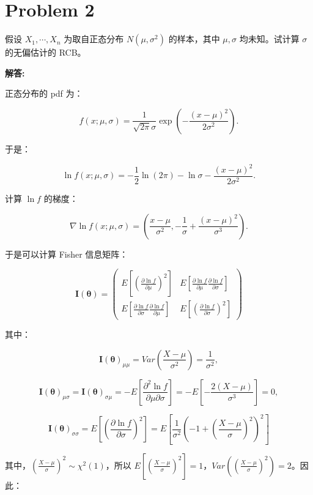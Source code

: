 \documentclass[12pt,a4paper]{article}
\begin{document}
\section{Problem 2}

假设 $X_1,\cdots,X_n$ 为取自正态分布 $N(\mu,\sigma^2)$ 的样本，其中 $\mu,\sigma$ 均未知。试计算 $\sigma$ 的无偏估计的 RCB。

\begin{answerbox}
\textbf{解答:}

正态分布的 pdf 为：

$$
f(x; \mu, \sigma) = \frac{1}{\sqrt{2\pi}\sigma} \exp\left(-\frac{(x-\mu)^2}{2\sigma^2}\right).
$$

于是：

$$
\ln f(x; \mu, \sigma) = -\frac{1}{2}\ln(2\pi) - \ln \sigma - \frac{(x-\mu)^2}{2\sigma^2}.
$$

计算 $\ln f$ 的梯度：

$$
\nabla \ln f(x; \mu, \sigma) = \left( \frac{x-\mu}{\sigma^2}, -\frac{1}{\sigma} + \frac{(x-\mu)^2}{\sigma^3} \right).
$$

于是可以计算 Fisher 信息矩阵：

$$
\mathbf{I}(\mathbf{\theta}) = \begin{pmatrix}
E\left[\left(\frac{\partial \ln f}{\partial \mu}\right)^2\right] & E\left[\frac{\partial \ln f}{\partial \mu} \frac{\partial \ln f}{\partial \sigma}\right] \\
E\left[\frac{\partial \ln f}{\partial \sigma} \frac{\partial \ln f}{\partial \mu}\right] & E\left[\left(\frac{\partial \ln f}{\partial \sigma}\right)^2\right]
\end{pmatrix}
$$

其中：

$$
\mathbf{I}(\mathbf{\theta})_{\mu\mu} = Var\left(\frac{X-\mu}{\sigma^2}\right) = \frac{1}{\sigma^2},
$$

$$
\mathbf{I}(\mathbf{\theta})_{\mu\sigma} = \mathbf{I}(\mathbf{\theta})_{\sigma\mu} = -E\left[\frac{\partial^2 \ln f}{\partial \mu \partial \sigma}\right] = -E\left[-\frac{2(X-\mu)}{\sigma^3}\right] = 0,
$$

$$
\mathbf{I}(\mathbf{\theta})_{\sigma\sigma} = E\left[\left(\frac{\partial \ln f}{\partial \sigma}\right)^2\right] = E\left[\frac{1}{\sigma^2}\left(-1+\left(\frac{X-\mu}{\sigma}\right)^2\right)^2\right]
$$

其中，$\left(\frac{X-\mu}{\sigma}\right)^2 \sim \chi^2(1)$，所以 $E\left[\left(\frac{X-\mu}{\sigma}\right)^2\right] = 1$，$Var\left(\left(\frac{X-\mu}{\sigma}\right)^2\right) = 2$。因此：


\end{answerbox}
\end{document}

